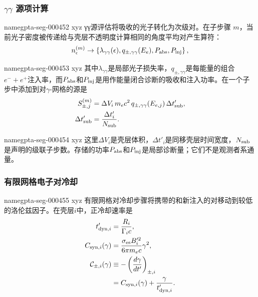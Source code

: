 \documentclass[twocolumn]{aastex702}
\makeatletter
\providecommand{\gptareaderanchor}[1]{\pdfdest name{#1} xyz}%
\providecommand{\gptareaderanchor}[1]{\special{pdf:dest (#1) [ @thispage /XYZ @xpos @ypos null ]}}%
\makeatother
\begin{document}
\subsubsection{\texorpdfstring{\(\gamma\gamma\)}{gamma-gamma} 源项计算}


\gptareaderanchor{gpta-seg-000452}%
γγ源评估将吸收的光子转化为次级对。在子步骤 \(m\)，当前光子密度被传递给与壳层不透明度计算相同的角度平均对产生算符：
\begin{equation}
n_\epsilon^{(m)}
\rightarrow
\left\{\lambda_{\gamma\gamma}(\epsilon),
q_{\pm,\gamma\gamma}(E_e),P_{\rm abs},P_{\rm inj}\right\},
\end{equation}

\gptareaderanchor{gpta-seg-000453}%
其中\(\lambda_{\gamma\gamma}\)是局部光子损失率，\(q_{\pm,\gamma\gamma}\)是每能量的组合\(e^-+e^+\)注入率，而\(P_{\rm abs}\)和\(P_{\rm inj}\)是用作能量闭合诊断的吸收和注入功率。在一个子步中添加到对\(\gamma\)-网格的源是
\begin{equation}
\begin{aligned}
S_{\pm,j}^{(m)}&=\Delta V_i\,m_ec^2\,
q_{\pm,\gamma\gamma}(E_{e,j})\,\Delta t'_{\rm sub},\\
\Delta t'_{\rm sub}&=\frac{\Delta t'_i}{N_{\rm sub}} .
\end{aligned}
\end{equation}

\gptareaderanchor{gpta-seg-000454}%
这里\(\Delta V_i\)是壳层体积，\(\Delta t'_i\)是同移壳层时间宽度，\(N_{\rm sub}\)是声明的级联子步数。存储的功率\(P_{\rm abs}\)和\(P_{\rm inj}\)是局部诊断量；它们不是观测者系通量。

\subsubsection{有限网格电子对冷却}


\gptareaderanchor{gpta-seg-000455}%
有限网格对冷却步骤将携带的和新注入的对移动到较低的洛伦兹因子。在壳层\(i\)中，正冷却速率是
\begin{equation}
\begin{aligned}
t'_{{\rm dyn},i}&=\frac{R_i}{\Gamma_i c},\\
C_{{\rm syn},i}(\gamma)
&=\frac{\sigma_{\rm es} B_i'^2}{6\pi m_ec}\gamma^2,\\
\mathcal{C}_{\pm,i}(\gamma)
&\equiv -\left(\frac{d\gamma}{dt'}\right)_{\pm,i}\\
&=C_{{\rm syn},i}(\gamma)+\frac{\gamma}{t'_{{\rm dyn},i}}.
\end{aligned}
\end{equation}
\end{document}
